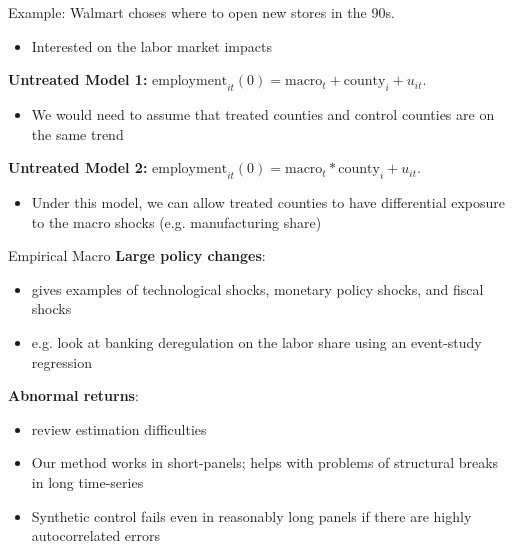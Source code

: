 \documentclass[aspectratio=43,t]{beamer}
\begin{document}
\begin{frame}{Example:}
    Walmart choses where to open new stores in the 90s.
    \begin{itemize}
        \item Interested on the labor market impacts
    \end{itemize}

    \vspace{.5cm} \pause

    \textbf{Untreated Model 1:} $\text{employment}_{it}(0) = \text{macro}_t + \text{county}_i + u_{it}$.
    \begin{itemize}
        \item We would need to assume that treated counties and control counties are on the same trend
    \end{itemize}

    \vspace{.5 cm}\pause 

    \textbf{Untreated Model 2:} $\text{employment}_{it}(0) = \text{macro}_t * \text{county}_i + u_{it}$.
    \begin{itemize}
        \item Under this model, we can allow treated counties to have differential exposure to the macro shocks (e.g. manufacturing share)
    \end{itemize}
\end{frame}


\begin{frame}{Empirical Macro}
  \textbf{Large policy changes}: 
  \begin{itemize}
    \item \citet{ramey2016macroeconomic} gives examples of technological shocks, monetary policy shocks, and fiscal shocks
    \item e.g. \citet{leblebiciouglu2020credit} look at banking deregulation on the labor share using an event-study regression
  \end{itemize}

  \smallskip
  \textbf{Abnormal returns}: 
  \begin{itemize}
    \item \citet{kothari2007econometrics} review estimation difficulties
    \item Our method works in short-panels; helps with problems of structural breaks in long time-series
    \item Synthetic control fails even in reasonably long panels if there are highly autocorrelated errors
  \end{itemize}
\end{frame}
\end{document}
